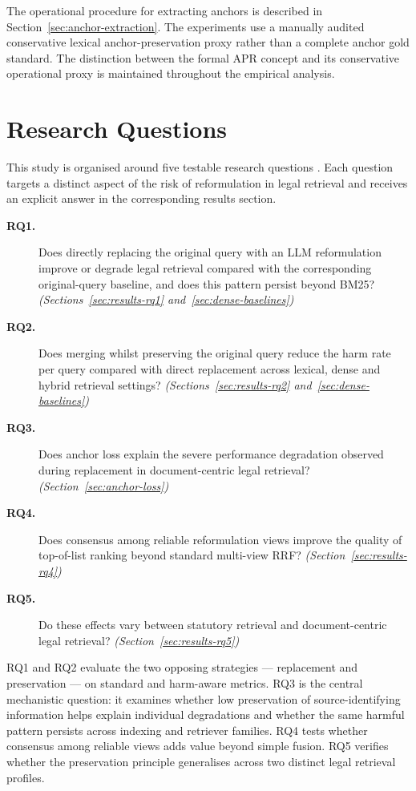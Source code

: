 \documentclass[a4paper,fleqn]{cas-dc}
\begin{document}
The operational procedure for extracting anchors is described in
Section~\ref{sec:anchor-extraction}. The experiments use a manually
audited conservative lexical anchor-preservation proxy rather than a
complete anchor gold standard. The distinction between the formal APR
concept and its conservative operational proxy is maintained throughout
the empirical analysis.
\section{Research Questions}
This study is organised around five testable research questions
. Each question targets a distinct aspect of the 
risk of reformulation in legal retrieval and receives an 
explicit answer in the corresponding results section.
\begin{description}
\item[\textbf{RQ1.}] Does directly replacing the original query 
with an LLM reformulation improve or degrade legal retrieval
compared with the corresponding original-query baseline, and
does this pattern persist beyond BM25?
\hfill \textit{(Sections~\ref{sec:results-rq1} and~\ref{sec:dense-baselines})}
\item[\textbf{RQ2.}] Does merging whilst preserving the original query 
reduce the harm rate per query compared with direct replacement
across lexical, dense and hybrid retrieval settings?
\hfill \textit{(Sections~\ref{sec:results-rq2} and~\ref{sec:dense-baselines})}
\item[\textbf{RQ3.}] Does anchor loss explain the 
severe performance degradation observed during replacement in 
document-centric legal retrieval?
\hfill \textit{(Section~\ref{sec:anchor-loss})}
\item[\textbf{RQ4.}] Does consensus among reliable reformulation views 
improve the quality of top-of-list ranking 
beyond standard multi-view RRF?
\hfill \textit{(Section~\ref{sec:results-rq4})}
\item[\textbf{RQ5.}] Do these effects vary between statutory 
retrieval and document-centric legal retrieval?
\hfill \textit{(Section~\ref{sec:results-rq5})}
\end{description}
RQ1 and RQ2 evaluate the two opposing strategies — replacement 
and preservation — on standard and harm-aware metrics. RQ3 
is the central mechanistic question: it examines whether low
preservation of source-identifying information helps explain
individual degradations and whether the same harmful pattern
persists across indexing and retriever families. RQ4 tests whether 
consensus among reliable views adds value beyond 
simple fusion. RQ5 verifies whether the preservation principle 
generalises across two distinct legal retrieval profiles.
\end{document}
